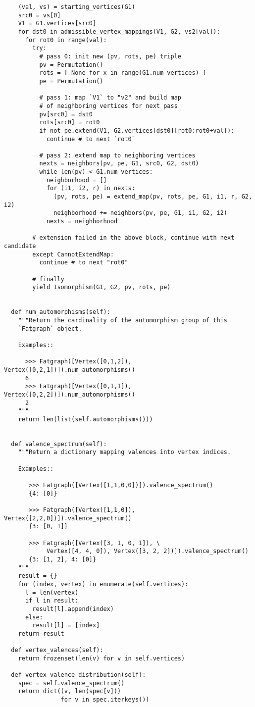 \begin{lstlisting}
    (val, vs) = starting_vertices(G1)
    src0 = vs[0]
    V1 = G1.vertices[src0]
    for dst0 in admissible_vertex_mappings(V1, G2, vs2[val]):
      for rot0 in range(val):
        try:
          # pass 0: init new (pv, rots, pe) triple
          pv = Permutation()
          rots = [ None for x in range(G1.num_vertices) ]
          pe = Permutation()

          # pass 1: map `V1` to "v2" and build map
          # of neighboring vertices for next pass
          pv[src0] = dst0
          rots[src0] = rot0
          if not pe.extend(V1, G2.vertices[dst0][rot0:rot0+val]):
            continue # to next `rot0`

          # pass 2: extend map to neighboring vertices
          nexts = neighbors(pv, pe, G1, src0, G2, dst0)
          while len(pv) < G1.num_vertices:
            neighborhood = []
            for (i1, i2, r) in nexts:
              (pv, rots, pe) = extend_map(pv, rots, pe, G1, i1, r, G2, i2)
              neighborhood += neighbors(pv, pe, G1, i1, G2, i2)
            nexts = neighborhood

        # extension failed in the above block, continue with next candidate
        except CannotExtendMap:
          continue # to next "rot0"

        # finally
        yield Isomorphism(G1, G2, pv, rots, pe)


  def num_automorphisms(self):
    """Return the cardinality of the automorphism group of this
    `Fatgraph` object.

    Examples::

      >>> Fatgraph([Vertex([0,1,2]), Vertex([0,2,1])]).num_automorphisms()
      6
      >>> Fatgraph([Vertex([0,1,1]), Vertex([0,2,2])]).num_automorphisms()
      2
    """
    return len(list(self.automorphisms()))
  

  def valence_spectrum(self):
    """Return a dictionary mapping valences into vertex indices.

    Examples::

       >>> Fatgraph([Vertex([1,1,0,0])]).valence_spectrum()
       {4: [0]}

       >>> Fatgraph([Vertex([1,1,0]), Vertex([2,2,0])]).valence_spectrum()
       {3: [0, 1]}

       >>> Fatgraph([Vertex([3, 1, 0, 1]), \
            Vertex([4, 4, 0]), Vertex([3, 2, 2])]).valence_spectrum()
       {3: [1, 2], 4: [0]}
    """
    result = {}
    for (index, vertex) in enumerate(self.vertices):
      l = len(vertex)
      if l in result:
        result[l].append(index)
      else:
        result[l] = [index]
    return result

  def vertex_valences(self):
    return frozenset(len(v) for v in self.vertices)

  def vertex_valence_distribution(self):
    spec = self.valence_spectrum()
    return dict((v, len(spec[v]))
                for v in spec.iterkeys())
\end{lstlisting}


